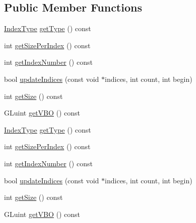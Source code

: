 \subsection*{Public Member Functions}
\begin{DoxyCompactItemize}
\item 
\hyperlink{classIndexBuffer_ae2117eacd3734db21ce838397fe96c63}{Index\+Type} \hyperlink{classIndexBuffer_a5e526c27fbb08150f04330ccce4d838e}{get\+Type} () const
\item 
int \hyperlink{classIndexBuffer_a598dc0ed5aa4f8266a5ee04c6e8ffb94}{get\+Size\+Per\+Index} () const
\item 
int \hyperlink{classIndexBuffer_a29e7b1441a2501111ae9ea3e91ad842c}{get\+Index\+Number} () const
\item 
bool \hyperlink{classIndexBuffer_aa73c6fe1387b942e6d570d443e6e37c1}{update\+Indices} (const void $\ast$indices, int count, int begin)
\item 
int \hyperlink{classIndexBuffer_a3c585378aeead477542951d977fbf9d5}{get\+Size} () const
\item 
G\+Luint \hyperlink{classIndexBuffer_aaea3df1f8e3ff4af169b6aa0206b8d07}{get\+V\+BO} () const
\item 
\hyperlink{classIndexBuffer_ae2117eacd3734db21ce838397fe96c63}{Index\+Type} \hyperlink{classIndexBuffer_a476ab69c73e31eb4ca8c3619b2fa940f}{get\+Type} () const
\item 
int \hyperlink{classIndexBuffer_a598dc0ed5aa4f8266a5ee04c6e8ffb94}{get\+Size\+Per\+Index} () const
\item 
int \hyperlink{classIndexBuffer_a29e7b1441a2501111ae9ea3e91ad842c}{get\+Index\+Number} () const
\item 
bool \hyperlink{classIndexBuffer_aa73c6fe1387b942e6d570d443e6e37c1}{update\+Indices} (const void $\ast$indices, int count, int begin)
\item 
int \hyperlink{classIndexBuffer_a3c585378aeead477542951d977fbf9d5}{get\+Size} () const
\item 
G\+Luint \hyperlink{classIndexBuffer_aaea3df1f8e3ff4af169b6aa0206b8d07}{get\+V\+BO} () const
\end{DoxyCompactItemize}
